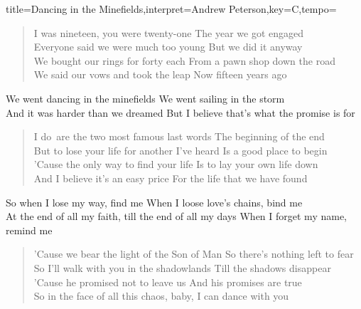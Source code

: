\documentclass{leadsheet}
\begin{document}
\begin{song}{title={Dancing in the Minefields},interpret={Andrew Peterson},key={C},tempo={}}

\begin{schedule}
\end{schedule}

\begin{verse}
I was nineteen, you were twenty-one
The year we got engaged \\
Everyone said we were much too young
But we did it anyway \\
We bought our rings for forty each
From a pawn shop down the road \\
We said our vows and took the leap
Now fifteen years ago
\end{verse}

\begin{chorus}
We went dancing in the minefields
We went sailing in the storm \\
And it was harder than we dreamed
But I believe that's what the promise is for
\end{chorus}

\begin{verse}
\frqq I do\flqq~are the two most famous last words
The beginning of the end \\
But to lose your life for another I've heard
Is a good place to begin \\
'Cause the only way to find your life
Is to lay your own life down \\
And I believe it's an easy price
For the life that we have found
\end{verse}

\begin{bridge}
So when I lose my way, find me
When I loose love's chains, bind me \\
At the end of all my faith, till the end of all my days
When I forget my name, remind me
\end{bridge}

\begin{verse}
'Cause we bear the light of the Son of Man
So there's nothing left to fear \\
So I'll walk with you in the shadowlands
Till the shadows disappear \\
'Cause he promised not to leave us
And his promises are true \\
So in the face of all this chaos, baby,
I can dance with you
\end{verse}


\end{song}
\end{document}
